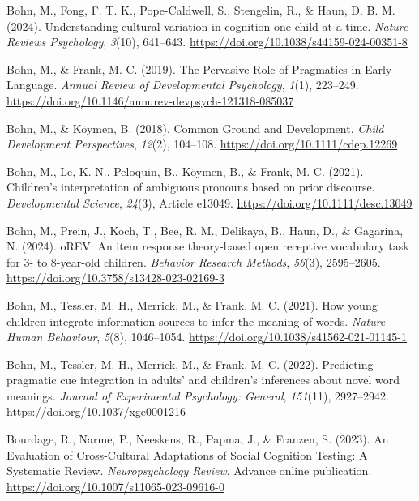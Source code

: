 \documentclass[
]{scrbook}
\newlength{\cslhangindent}
\newenvironment{CSLReferences}[2] %
 {\begin{list}{}{%
  \setlength{\itemindent}{0pt}
  \setlength{\leftmargin}{0pt}
  \setlength{\parsep}{0pt}
  \ifodd #1
   \setlength{\leftmargin}{\cslhangindent}
   \setlength{\itemindent}{-1\cslhangindent}
  \fi
  \setlength{\itemsep}{#2\baselineskip}}}
 {\end{list}}
\begin{document}
\begin{CSLReferences}{1}{0}
Bohn, M., Fong, F. T. K., Pope-Caldwell, S., Stengelin, R., \& Haun, D. B. M. (2024). Understanding cultural variation in cognition one child at a time. \emph{Nature Reviews Psychology}, \emph{3}(10), 641--643. \url{https://doi.org/10.1038/s44159-024-00351-8}

Bohn, M., \& Frank, M. C. (2019). The {Pervasive Role} of {Pragmatics} in {Early Language}. \emph{Annual Review of Developmental Psychology}, \emph{1}(1), 223--249. \url{https://doi.org/10.1146/annurev-devpsych-121318-085037}

Bohn, M., \& Köymen, B. (2018). Common {Ground} and {Development}. \emph{Child Development Perspectives}, \emph{12}(2), 104--108. \url{https://doi.org/10.1111/cdep.12269}

Bohn, M., Le, K. N., Peloquin, B., Köymen, B., \& Frank, M. C. (2021). Children's interpretation of ambiguous pronouns based on prior discourse. \emph{Developmental Science}, \emph{24}(3), Article e13049. \url{https://doi.org/10.1111/desc.13049}

Bohn, M., Prein, J., Koch, T., Bee, R. M., Delikaya, B., Haun, D., \& Gagarina, N. (2024). {oREV}: {An} item response theory-based open receptive vocabulary task for 3- to 8-year-old children. \emph{Behavior Research Methods}, \emph{56}(3), 2595--2605. \url{https://doi.org/10.3758/s13428-023-02169-3}

Bohn, M., Tessler, M. H., Merrick, M., \& Frank, M. C. (2021). How young children integrate information sources to infer the meaning of words. \emph{Nature Human Behaviour}, \emph{5}(8), 1046--1054. \url{https://doi.org/10.1038/s41562-021-01145-1}

Bohn, M., Tessler, M. H., Merrick, M., \& Frank, M. C. (2022). Predicting pragmatic cue integration in adults' and children's inferences about novel word meanings. \emph{Journal of Experimental Psychology: General}, \emph{151}(11), 2927--2942. \url{https://doi.org/10.1037/xge0001216}

Bourdage, R., Narme, P., Neeskens, R., Papma, J., \& Franzen, S. (2023). An {Evaluation} of {Cross-Cultural Adaptations} of {Social Cognition Testing}: {A Systematic Review}. \emph{Neuropsychology Review}, Advance online publication. \url{https://doi.org/10.1007/s11065-023-09616-0}


\end{CSLReferences}
\end{document}
